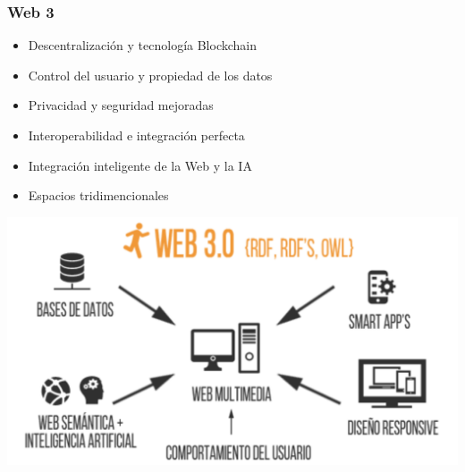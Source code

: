 \documentclass[
10pt, %
aspectratio=169, %
]{beamer}
\begin{document}
	\begin{frame}
		
		\frametitle{Web 3}
		
		\begin{itemize}
			
			\item Descentralización y tecnología Blockchain 
			
			\item Control del usuario y propiedad de los datos 
			
			\item Privacidad y seguridad mejoradas 
			
			\item Interoperabilidad e integración perfecta 
			
			\item Integración inteligente de la Web y la IA 
			
			\item Espacios tridimencionales 
			
		\end{itemize}
		
		\centering
		\includegraphics[scale=0.37]{web_3.png} 
		

\end{frame}
\end{document}
